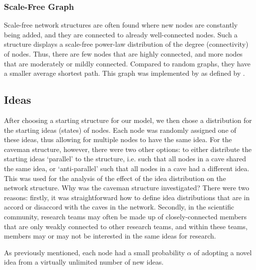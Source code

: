 \subsubsection{Scale-Free Graph}
\label{4.5}

Scale-free network structures are often found where new nodes are constantly being added, and they are connected to already well-connected nodes. Such a structure displays a scale-free power-law distribution of the degree (connectivity) of nodes. Thus, there are few nodes that are highly connected, and more nodes that are moderately or mildly connected. Compared to random graphs, they have a smaller average shortest path. This graph was implemented by \citet*{BS2011} as defined by \citet*{BA1999}.


\subsection{Ideas}
\label{4.6}

After choosing a starting structure for our model, we then chose a distribution for the starting ideas (states) of nodes. Each node was randomly assigned one of these ideas, thus allowing for multiple nodes to have the same idea. For the caveman structure, however, there were two other options: to either distribute the starting ideas `parallel' to the structure, i.e. such that all nodes in a cave shared the same idea, or `anti-parallel' such that all nodes in a cave had a different idea. This was used for the analysis of the effect of the idea distribution on the network structure. Why was the caveman structure investigated? There were two reasons: firstly, it was straightforward how to define idea distributions that are in accord or disaccord with the caves in the network. Secondly, in the scientific community, research teams may often be made up of closely-connected members that are only weakly connected to other research teams, and within these teams, members may or may not be interested in the same ideas for research. 

As previously mentioned, each node had a small probability $\alpha$ of adopting a novel idea from a virtually unlimited number of new ideas.